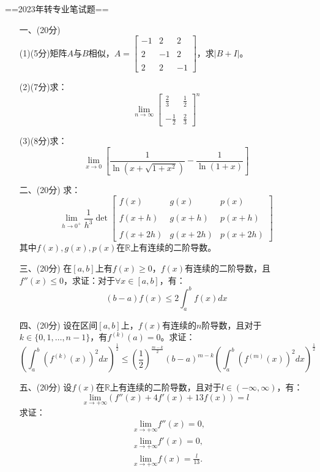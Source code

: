 ==2023年转专业笔试题==
\begin{enumerate}
\item[一、(20分)]
\\
(1)(5分)矩阵$A$与$B$相似，$A=\begin{bmatrix} -1 & 2 & 2 \\ \\2 & -1 & 2 \\ \\2 & 2 & -1 \end{bmatrix}$，求$|B+I|$。

(2)(7分)求：
$$\underset{n\to\infty}{\lim}\begin{bmatrix} \frac{2}{3} &\frac{1}{2}\\ \\-\frac{1}{2} &\frac{2}{3}\end{bmatrix}^n$$

(3)(8分)求：
$$\underset{x\to 0}{\lim}\left[\frac{1}{\ln(x+\sqrt{1+x^2})}-\frac{1}{\ln(1+x)}\right]$$


\item[二、(20分)]
求：
$$
\lim_{h\to0^+}\frac{1}{h^3}\det\begin{bmatrix} f(x) & g(x) & p(x)\\ \\f(x+h) & g(x+h) & p(x+h)\\ \\ f(x+2h) & g(x+2h) & p(x+2h) \end{bmatrix}
$$
其中$f(x),g(x),p(x)$在$\mathbb{R}$上有连续的二阶导数。

\item[三、(20分)]
在$[a,b]$上有$f(x)\geq 0$，$f(x)$有连续的二阶导数，且$f''(x)\leq 0$，求证：对于$\forall x\in[a,b]$，有：
$$(b-a)f(x)\leq 2\int_a^bf(x)dx$$

\item[四、(20分)]
设在区间$[a,b]$上，$f(x)$有连续的$n$阶导数，且对于$k \in \{0,1,\dots,n-1\}$，有$f^{(k)}(a)=0$。求证：
$$
\left(\int_a^b(f^{(k)}(x))^2dx\right)^\frac{1}{2}\leq\left(\frac{1}{2}\right)^\frac{m-k}{2}(b-a)^{m-k}\left(\int_a^b(f^{(m)}(x))^2dx\right)^\frac{1}{2}
$$

\item[五、(20分)]
设$f(x)$在$\mathbb{R}$上有连续的二阶导数，且对于$l\in(-\infty,\infty)$，有：
$$
\underset{x\to +\infty}{\text{lim}}(f''(x)+4f'(x)+13f(x))=l
$$
求证：
\begin{align*}
    &\underset{x\to +\infty}{\text{lim}}f''(x)=0,\\
    &\underset{x\to +\infty}{\text{lim}}f'(x)=0,\\
    &\underset{x\to +\infty}{\text{lim}}f(x)=\frac{l}{13}.
\end{align*}

\end{enumerate}


